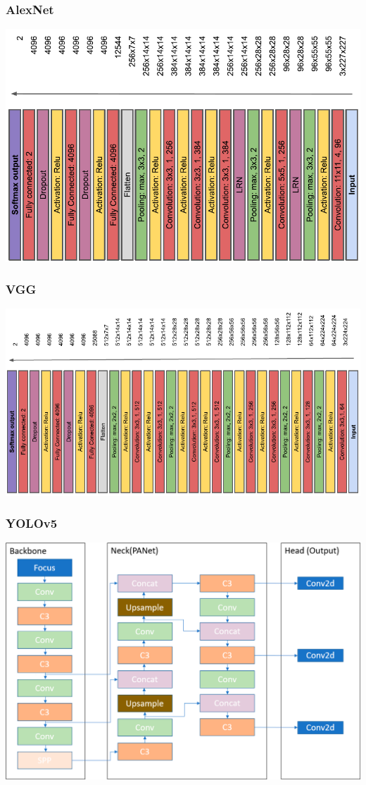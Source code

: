 \begin{frame}
\frametitle{AlexNet}
\centering
    \includegraphics[width=0.65\linewidth]{Figuras/Img13.png}
\end{frame}

\begin{frame}
\frametitle{VGG}
\centering
    \includegraphics[width=0.8\linewidth]{Figuras/Img14.png}
\end{frame}

\begin{frame}
\frametitle{YOLOv5}
\centering
    \includegraphics[width=0.65\linewidth]{Figuras/yolov5.png}
\end{frame}


